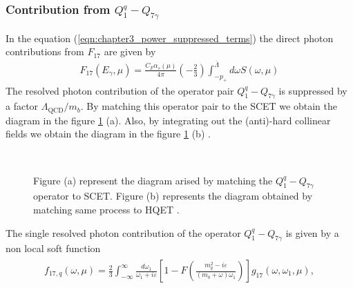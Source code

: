 \subsubsection{Contribution from $Q_1^q-Q_{7\gamma}$}\label{Q1Q7_contr}
\vspace{-0.3cm}
In the equation (\ref{eqn:chapter3_power_suppressed_terms}) the direct photon contributions from $F_{17}$ are given by
\begin{eqnarray}
F_{17}\left(E_{\gamma}, \mu\right)=\frac{C_{F} \alpha_{s}(\mu)}{4 \pi}\left(-\frac{2}{3}\right) \int_{-p_{+}}^{\bar{\Lambda}} d \omega S(\omega, \mu)
\end{eqnarray}
The resolved photon contribution of the operator pair $Q_1^q-Q_{7\gamma}$ is suppressed by a factor $\Lambda_{\mathrm{QCD}} / m_{b}$. By matching this operator pair to the SCET we obtain the diagram in the figure \ref{fig:Q1Q7} (a). Also, by integrating out the (anti)-hard collinear fields we obtain the diagram in the figure \ref{fig:Q1Q7} (b) \cite{Benzke:2010js}.   
\begin{figure}[H]
\\
\caption{\label{fig:Q1Q7}Figure (a) represent the diagram arised by matching the $Q_1^q-Q_{7\gamma}$ operator to SCET. Figure (b) represents the diagram obtained by matching same process to HQET \cite{Benzke:2010js}.}
\end{figure}
The single resolved photon contribution of the operator $Q_{1}^q-Q_{7\gamma}$ is given by a non local soft function \cite{Benzke:2010js}
\begin{eqnarray}
\begin{aligned}\label{eqn:chapter3_single_resolved_photon_Q1Q7}
f_{17, q}(\omega, \mu)=\frac{2}{3} \int_{-\infty}^{\infty} \frac{d \omega_{1}}{\omega_{1}+i \varepsilon}\left[1-F\left(\frac{m_{q}^{2}-i \varepsilon}{\left(m_{b}+\omega\right) \omega_{1}}\right)\right] g_{17}\left(\omega, \omega_{1}, \mu\right),
\end{aligned}
\end{eqnarray}
